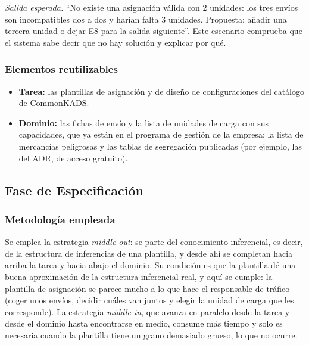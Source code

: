 \documentclass[12pt,a4paper,twoside,spanish]{article}      %
\begin{document}
\emph{Salida esperada.} ``No existe una asignación válida con 2 unidades: los
tres envíos son incompatibles dos a dos y harían falta 3 unidades. Propuesta:
añadir una tercera unidad o dejar E8 para la salida siguiente''. Este
escenario comprueba que el sistema sabe decir que no hay solución y explicar
por qué.

\subsubsection{Elementos reutilizables}

\begin{itemize}
 \item \textbf{Tarea:} las plantillas de asignación y de diseño de
 configuraciones del catálogo de CommonKADS.
 \item \textbf{Dominio:} las fichas de envío y la lista de unidades de carga
 con sus capacidades, que ya están en el programa de gestión de la empresa;
 la lista de mercancías peligrosas y las tablas de segregación publicadas
 (por ejemplo, las del ADR, de acceso gratuito).
\end{itemize}


\subsection{Fase de Especificación}

\subsubsection{Metodología empleada}
Se emplea la estrategia \emph{middle-out}: se parte del conocimiento
inferencial, es decir, de la estructura de inferencias de una plantilla, y
desde ahí se completan hacia arriba la tarea y hacia abajo el dominio. Su
condición es que la plantilla dé una buena aproximación de la estructura
inferencial real, y aquí se cumple: la plantilla de asignación se parece
mucho a lo que hace el responsable de tráfico (coger unos envíos, decidir
cuáles van juntos y elegir la unidad de carga que les corresponde). La
estrategia \emph{middle-in}, que avanza en paralelo desde la tarea y desde el
dominio hasta encontrarse en medio, consume más tiempo y solo es necesaria
cuando la plantilla tiene un grano demasiado grueso, lo que no ocurre.
\end{document}
